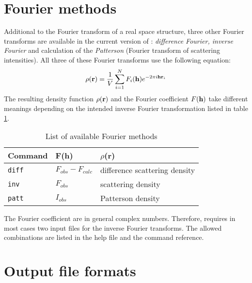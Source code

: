 
\section{Fourier methods \label {four-methods}}

Additional to the Fourier transform of a real space structure,
three other Fourier transforms are available in the current
version of {\Discus}: {\it difference Fourier, inverse Fourier}
and calculation of the {\it Patterson} (Fourier transform of
scattering intensities). All three of these Fourier transforms use
the following equation:
%
\begin{equation}
  \rho ({\bf r}) = \frac {1}{V} \sum_{i=1}^{N} F_{i} ({\bf h})
                   e ^{-2 \pi i {\bf hr}_{i}}
  \label{four-eq-inv}
\end{equation}
%
The resulting density function $\rho ({\bf r})$ and the Fourier
coefficient $F ({\bf h})$ take different meanings depending on the
intended inverse Fourier transformation listed in table
\ref{inv-tab}.
%
\begin{table}[!tbh]
\centering
\begin{tabularx}{\textwidth}{|p{22mm}|p{35mm}|X|}
  \hline
  {\bf Command} & {\bf F(h)} & {\bf $\rho$(r)} \\
  \hline\hline
  {\tt diff} & $F_{obs} - F_{calc}$ & difference scattering density \\
  {\tt inv}  & $F_{obs}$ & scattering density \\
  {\tt patt} & $I_{obs}$ & Patterson density \\
  \hline
\end{tabularx}
\caption{\label{inv-tab}List of available Fourier methods}
\end{table}
%
The Fourier coefficient are in general complex numbers.
Therefore, {\Discus} requires in most cases two input files for
the inverse Fourier transforms.  The allowed combinations are
listed in the help file and the command reference.


\section{Output file formats \label{four-out}}

